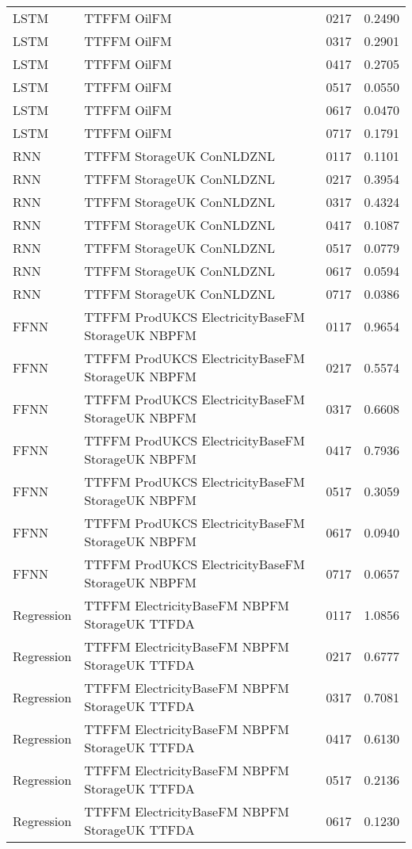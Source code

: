 \begin{table}[h!]
\begin{adjustbox}{max width=\textwidth}
\begin{tabular}{lllr}
  LSTM & TTFFM OilFM & 0217 & 0.2490 \\ 
  LSTM & TTFFM OilFM & 0317 & 0.2901 \\ 
  LSTM & TTFFM OilFM & 0417 & 0.2705 \\ 
  LSTM & TTFFM OilFM & 0517 & 0.0550 \\ 
  LSTM & TTFFM OilFM & 0617 & 0.0470 \\ 
  LSTM & TTFFM OilFM & 0717 & 0.1791 \\ 
  RNN & TTFFM StorageUK ConNLDZNL & 0117 & 0.1101 \\ 
  RNN & TTFFM StorageUK ConNLDZNL & 0217 & 0.3954 \\ 
  RNN & TTFFM StorageUK ConNLDZNL & 0317 & 0.4324 \\ 
  RNN & TTFFM StorageUK ConNLDZNL & 0417 & 0.1087 \\ 
  RNN & TTFFM StorageUK ConNLDZNL & 0517 & 0.0779 \\ 
  RNN & TTFFM StorageUK ConNLDZNL & 0617 & 0.0594 \\ 
  RNN & TTFFM StorageUK ConNLDZNL & 0717 & 0.0386 \\ 
  FFNN & TTFFM ProdUKCS ElectricityBaseFM StorageUK NBPFM & 0117 & 0.9654 \\ 
  FFNN & TTFFM ProdUKCS ElectricityBaseFM StorageUK NBPFM & 0217 & 0.5574 \\ 
  FFNN & TTFFM ProdUKCS ElectricityBaseFM StorageUK NBPFM & 0317 & 0.6608 \\ 
  FFNN & TTFFM ProdUKCS ElectricityBaseFM StorageUK NBPFM & 0417 & 0.7936 \\ 
  FFNN & TTFFM ProdUKCS ElectricityBaseFM StorageUK NBPFM & 0517 & 0.3059 \\ 
  FFNN & TTFFM ProdUKCS ElectricityBaseFM StorageUK NBPFM & 0617 & 0.0940 \\ 
  FFNN & TTFFM ProdUKCS ElectricityBaseFM StorageUK NBPFM & 0717 & 0.0657 \\ 
  Regression & TTFFM ElectricityBaseFM NBPFM StorageUK TTFDA & 0117 & 1.0856 \\ 
  Regression & TTFFM ElectricityBaseFM NBPFM StorageUK TTFDA & 0217 & 0.6777 \\ 
  Regression & TTFFM ElectricityBaseFM NBPFM StorageUK TTFDA & 0317 & 0.7081 \\ 
  Regression & TTFFM ElectricityBaseFM NBPFM StorageUK TTFDA & 0417 & 0.6130 \\ 
  Regression & TTFFM ElectricityBaseFM NBPFM StorageUK TTFDA & 0517 & 0.2136 \\ 
  Regression & TTFFM ElectricityBaseFM NBPFM StorageUK TTFDA & 0617 & 0.1230 \\ 

\end{tabular}
\end{adjustbox}
\end{table}

